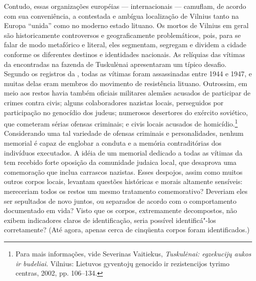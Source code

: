 Contudo, essas organizações européias --- internacionais --- camuflam, de
acordo com sua conveniência, a contestada e ambígua localização de
Vilnius tanto na Europa ``unida'' como no moderno estado lituano. Os
mortos de Vilnius em geral são historicamente controversos e
geograficamente problemáticos, pois, para se falar de modo metafórico e
literal, eles segmentam, segregam e dividem a cidade conforme os
diferentes destinos e identidades nacionais. As relíquias das vítimas da
 encontradas na fazenda de Tuskulėnai apresentaram um típico
desafio. Segundo os registros da , todas as vítimas foram
assassinadas entre 1944 e 1947, e muitas delas eram membros do movimento
de resistência lituano. Outrossim, em meio aos restos havia também
oficiais militares alemães acusados de participar de crimes contra
civis; alguns colaboradores nazistas locais, perseguidos por
participação no genocídio dos judeus; numerosos desertores do exército
soviético, que cometeram sérias ofensas criminais; e civis locais
acusados de homicídio.\footnote{Para mais informações, vide Severinas
  Vaitiekus, \emph{Tuskulėnai: egzekucijų aukos ir budeliai}. Vilnius:
  Lietuvos gyventojų genocido ir rezistencijos tyrimo centras, 2002, pp.
  106--134.} Considerando uma tal variedade de ofensas criminais e
personalidades, nenhum memorial é capaz de englobar a conduta e a
memória contraditórias dos indivíduos executados. A idéia de um memorial
dedicado a todas as vítimas da  tem recebido forte oposição da
comunidade judaica local, que desaprova uma comemoração que inclua
carrascos nazistas. Esses despojos, assim como muitos outros corpos
locais, levantam questões históricas e morais altamente sensíveis:
mereceriam todos os restos um mesmo tratamento comemorativo? Deveriam
eles ser sepultados de novo juntos, ou separados de acordo com o
comportamento documentado em vida? Visto que os corpos, extremamente
decompostos, não exibem indicadores claros de identificação, seria
possível identificá"-los corretamente? (Até agora, apenas cerca de
cinqüenta corpos foram identificados.)

